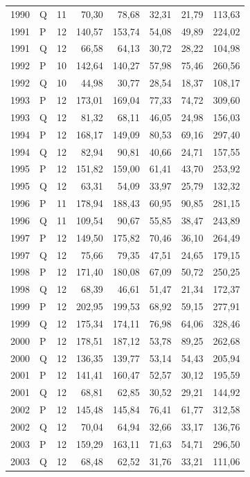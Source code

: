 \documentclass[10pt,a4paper]{article}
\begin{document}
\begin{longtable}{llrrrrrr}
1990 & Q & 11 & 70,30 & 78,68 & 32,31 & 21,79 & 113,63 \\
1991 & P & 12 & 140,57 & 153,74 & 54,08 & 49,89 & 224,02 \\
1991 & Q & 12 & 66,58 & 64,13 & 30,72 & 28,22 & 104,98 \\
1992 & P & 10 & 142,64 & 140,27 & 57,98 & 75,46 & 260,56 \\
1992 & Q & 10 & 44,98 & 30,77 & 28,54 & 18,37 & 108,17 \\
1993 & P & 12 & 173,01 & 169,04 & 77,33 & 74,72 & 309,60 \\
1993 & Q & 12 & 81,32 & 68,11 & 46,05 & 24,98 & 156,03 \\
1994 & P & 12 & 168,17 & 149,09 & 80,53 & 69,16 & 297,40 \\
1994 & Q & 12 & 82,94 & 90,81 & 40,66 & 24,71 & 157,55 \\
1995 & P & 12 & 151,82 & 159,00 & 61,41 & 43,70 & 253,92 \\
1995 & Q & 12 & 63,31 & 54,09 & 33,97 & 25,79 & 132,32 \\
1996 & P & 11 & 178,94 & 188,43 & 60,95 & 90,85 & 281,15 \\
1996 & Q & 11 & 109,54 & 90,67 & 55,85 & 38,47 & 243,89 \\
1997 & P & 12 & 149,50 & 175,82 & 70,46 & 36,10 & 264,49 \\
1997 & Q & 12 & 75,66 & 79,35 & 47,51 & 24,65 & 179,15 \\
1998 & P & 12 & 171,40 & 180,08 & 67,09 & 50,72 & 250,25 \\
1998 & Q & 12 & 68,39 & 46,61 & 51,47 & 21,34 & 172,37 \\
1999 & P & 12 & 202,95 & 199,53 & 68,92 & 59,15 & 277,91 \\
1999 & Q & 12 & 175,34 & 174,11 & 76,98 & 64,06 & 328,46 \\
2000 & P & 12 & 178,51 & 187,12 & 53,78 & 89,25 & 262,68 \\
2000 & Q & 12 & 136,35 & 139,77 & 53,14 & 54,43 & 205,94 \\
2001 & P & 12 & 141,41 & 160,47 & 52,57 & 30,12 & 195,59 \\
2001 & Q & 12 & 68,81 & 62,85 & 30,52 & 29,21 & 144,92 \\
2002 & P & 12 & 145,48 & 145,84 & 76,41 & 61,77 & 312,58 \\
2002 & Q & 12 & 70,04 & 64,94 & 32,66 & 33,17 & 136,76 \\
2003 & P & 12 & 159,29 & 163,11 & 71,63 & 54,71 & 296,50 \\
2003 & Q & 12 & 68,48 & 62,52 & 31,76 & 33,21 & 111,06 \\

\end{longtable}
\end{document}
